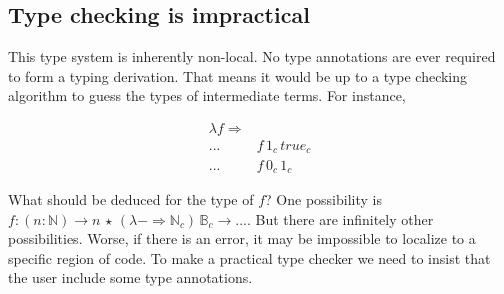 
 
 
 
 
\subsection{Type checking is impractical}
 
This type system is inherently non-local.
No type annotations are ever required to form a typing derivation.
That means it would be up to a type checking algorithm to guess the types of intermediate terms.
For instance,
 
\begin{align*}
\lambda f\Rightarrow & \,\\
... & f\,1_{c}\,true_{c}\\
... & f\,0_{c}\,1_{c}
\end{align*}

What should be deduced for the type of $f$? One possibility is $f:\left(n:\mathbb{N}\right)\rightarrow n\,\star\,\left(\lambda-\Rightarrow\mathbb{N}_{c}\right)\,\mathbb{B}_{c}\rightarrow...$.
But there are infinitely other possibilities.
Worse, if there is an error, it may be impossible to localize to a specific region of code.
To make a practical type checker we need to insist that the user include some type annotations.